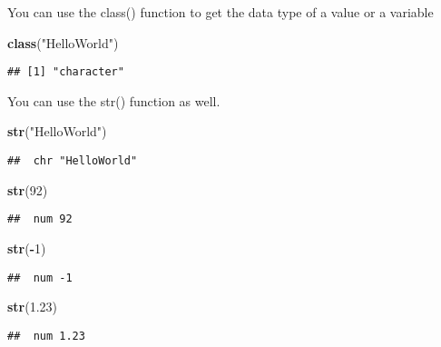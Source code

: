 \documentclass[
]{article}
\newenvironment{Shaded}{\begin{snugshade}}{\end{snugshade}}
\newcommand{\DecValTok}[1]{\textcolor[rgb]{0.00,0.00,0.81}{#1}}
\newcommand{\FloatTok}[1]{\textcolor[rgb]{0.00,0.00,0.81}{#1}}
\newcommand{\KeywordTok}[1]{\textcolor[rgb]{0.13,0.29,0.53}{\textbf{#1}}}
\newcommand{\NormalTok}[1]{#1}
\newcommand{\OperatorTok}[1]{\textcolor[rgb]{0.81,0.36,0.00}{\textbf{#1}}}
\newcommand{\StringTok}[1]{\textcolor[rgb]{0.31,0.60,0.02}{#1}}
\begin{document}
You can use the class() function to get the data type of a value or a
variable

\begin{Shaded}
\begin{Highlighting}[]
 \KeywordTok{class}\NormalTok{(}\StringTok{"HelloWorld"}\NormalTok{)}
\end{Highlighting}
\end{Shaded}

\begin{verbatim}
## [1] "character"
\end{verbatim}

You can use the str() function as well.

\begin{Shaded}
\begin{Highlighting}[]
\KeywordTok{str}\NormalTok{(}\StringTok{"HelloWorld"}\NormalTok{)}
\end{Highlighting}
\end{Shaded}

\begin{verbatim}
##  chr "HelloWorld"
\end{verbatim}

\begin{Shaded}
\begin{Highlighting}[]
\KeywordTok{str}\NormalTok{(}\DecValTok{92}\NormalTok{)}
\end{Highlighting}
\end{Shaded}

\begin{verbatim}
##  num 92
\end{verbatim}

\begin{Shaded}
\begin{Highlighting}[]
\KeywordTok{str}\NormalTok{(}\OperatorTok{-}\DecValTok{1}\NormalTok{)}
\end{Highlighting}
\end{Shaded}

\begin{verbatim}
##  num -1
\end{verbatim}

\begin{Shaded}
\begin{Highlighting}[]
\KeywordTok{str}\NormalTok{(}\FloatTok{1.23}\NormalTok{)}
\end{Highlighting}
\end{Shaded}

\begin{verbatim}
##  num 1.23
\end{verbatim}
\end{document}

